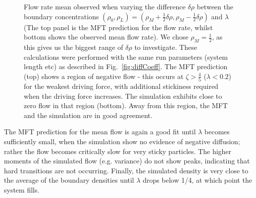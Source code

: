 \documentclass[
reprint, amsmath,amssymb,
]{revtex4-1}
\begin{document}
\begin{figure}[h!]
\begin{center}
\begin{tabular}{c}
    \end{tabular}
\end{center}
    \vspace{0em}
\caption{\label{fig:constDens} Flow rate mean observed when varying the difference $\delta\rho$ between the boundary concentrations
$(\rho_0, \rho_L) = (\rho_M + \frac{1}{2} \delta\rho, \rho_M - \frac{1}{2} \delta\rho)$ and $\lambda$ (The top panel is the MFT prediction
for the flow rate, whilst bottom shows the observed mean flow rate).
We chose $\rho_M=\frac{1}{2}$, as this gives us the biggest range of $\delta\rho$ to investigate.
These calculations were performed with the same run parameters (system length etc) as described in Fig.~\ref{fig:diffCoeff}.
The MFT prediction (top) shows a region of
negative flow - this occurs at $\zeta > \frac{4}{5}$ ($\lambda < 0.2$) for the weakest
driving force, with additional stickiness required when the driving
force increases. The simulation exhibits close to zero flow in that
region (bottom).  Away from this region, the MFT and
the simulation are in good agreement.
}
\end{figure}

The MFT prediction for the mean flow is again a good fit until $\lambda$ becomes sufficiently small,
when the simulation show no evidence of negative diffusion; rather the flow becomes critically slow for very sticky particles.
The higher moments of the simulated flow (e.g. variance) do not show peaks, indicating that hard transitions are not occurring.
Finally, the  simulated density is very close to the average of the boundary densities until $\lambda$ drops below 1/4, at which point the system fills.
\end{document}
